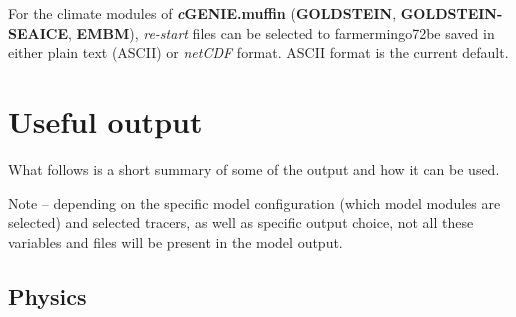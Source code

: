 \documentclass[11pt,fleqn]{book} %
\begin{document}
For the climate modules of \textbf{\textit{c}GENIE.muffin} (\textbf{GOLDSTEIN}, \textbf{GOLDSTEIN-SEAICE}, \textbf{EMBM}), \textit{re-start} files can be selected to farmermingo72be saved in either plain text (ASCII) or \textit{netCDF} format. ASCII format is the current default.


\newpage


\section{Useful output}

What follows is a short summary of some of the output and how it can be used.

Note -- depending on the specific model configuration (which model modules are selected) and selected tracers, as well as specific output choice, not all these variables and files will be present in the model output.


\subsection{Physics}
\end{document}
